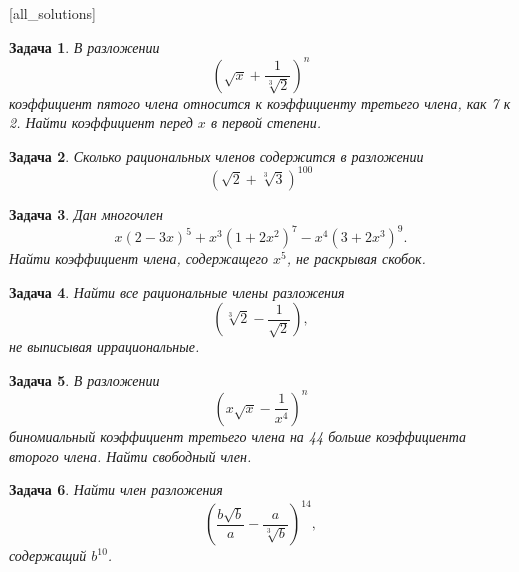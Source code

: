 \documentclass[12pt, a4paper]{article}
\newtheorem{problem}{Задача}
\begin{document}
[all_solutions]


\begin{problem}
В разложении \[\left(\sqrt{x} + \frac{1}{\sqrt[3]{2}}\right)^n\] коэффициент пятого члена относится к коэффициенту третьего члена, как 7 к 2. Найти коэффициент перед $x$ в первой степени.
\begin{sol}

\end{sol}
\end{problem}



\begin{problem}
Сколько рациональных членов содержится в разложении \[(\sqrt{2} + \sqrt[3]{3})^{100} \]
\begin{sol}

\end{sol}
\end{problem}



\begin{problem}
Дан многочлен \[x (2-3x)^5 + x^3 (1 + 2x^2)^7 - x^4 (3 + 2x^3)^9.\] Найти коэффициент члена, содержащего $x^5$, не раскрывая скобок.
\begin{sol}

\end{sol}
\end{problem}



\begin{problem}
Найти все рациональные члены разложения \[\left( \sqrt[3]{2} - \frac{1}{\sqrt{2}} \right),\] не выписывая иррациональные.
\begin{sol}

\end{sol}
\end{problem}



\begin{problem}
В разложении \[\left( x \sqrt{x} - \frac{1}{x^4} \right)^n\] биномиальный коэффициент третьего члена на 44 больше коэффициента второго члена. Найти свободный член.
\begin{sol}

\end{sol}
\end{problem}



\begin{problem}
Найти член разложения \[\left( \frac{b \sqrt{b}}{a} - \frac{a}{\sqrt[3]{b}} \right)^{14},\] содержащий $b^{10}$.
\begin{sol}

\end{sol}
\end{problem}
\end{document}
